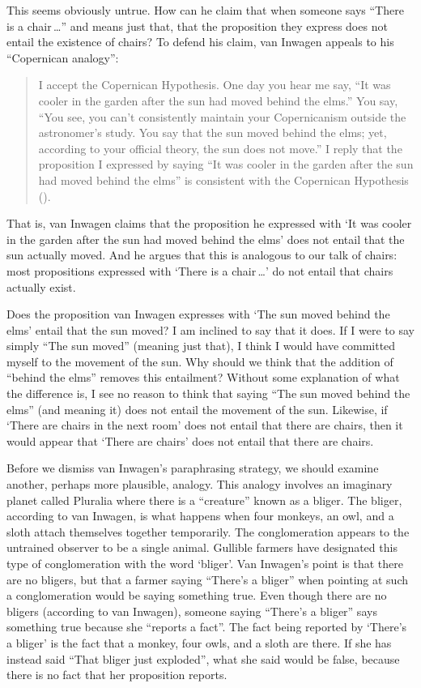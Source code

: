\documentclass[12pt,twoside]{reedfancy}
\begin{document}
\begin{spacing}{1.25}
This seems obviously untrue.  How can he claim that when someone says
``There is a chair\,\ldots '' and means just that, that the
proposition they express does not entail the existence of chairs?  To
defend his claim, van Inwagen appeals to his ``Copernican analogy'':

\begin{quote}
I accept the Copernican Hypothesis.  One day you hear me say, ``It was
cooler in the garden after the sun had moved behind the elms.''  You
say, ``You see, you can't consistently maintain your Copernicanism
outside the astronomer's study.  You say that the sun moved behind the
elms; yet, according to your official theory, the sun does not move.''
I reply that the proposition I expressed by saying ``It was cooler in
the garden after the sun had moved behind the elms'' is consistent
with the Copernican Hypothesis (\citeyear[101]{inwagen1995}).
\end{quote}
That is, van Inwagen claims that the proposition he expressed with `It
was cooler in the garden after the sun had moved behind the elms' does
not entail that the sun actually moved.  And he argues that this is
analogous to our talk of chairs: most propositions expressed with
`There is a chair\,\ldots ' do not entail that chairs actually exist.

Does the proposition van Inwagen expresses with `The sun moved behind
the elms' entail that the sun moved?  I am inclined to say that it
does.  If I were to say simply ``The sun moved'' (meaning just that),
I think I would have committed myself to the movement of the sun.  Why
should we think that the addition of ``behind the elms'' removes this
entailment?  Without some explanation of what the difference is, I see
no reason to think that saying ``The sun moved behind the elms'' (and
meaning it) does not entail the movement of the sun.  Likewise, if
`There are chairs in the next room' does not entail that there are
chairs, then it would appear that `There are chairs' does not entail
that there are chairs.

Before we dismiss van Inwagen's paraphrasing strategy, we should
examine another, perhaps more plausible, analogy.  This analogy
involves an imaginary planet called Pluralia where there is a
``creature'' known as a bliger.  The bliger, according to van Inwagen,
is what happens when four monkeys, an owl, and a sloth attach
themselves together temporarily.  The conglomeration appears to the
untrained observer to be a single animal.  Gullible farmers have
designated this type of conglomeration with the word `bliger'.  Van
Inwagen's point is that there are no bligers, but that a farmer saying
``There's a bliger'' when pointing at such a conglomeration would be
saying something true.  Even though there are no bligers (according to
van Inwagen), someone saying ``There's a bliger'' says something true
because she ``reports a fact''.  The fact being reported by `There's a
bliger' is the fact that a monkey, four owls, and a sloth are there.
If she has instead said ``That bliger just exploded'', what she said
would be false, because there is no fact that her proposition reports.


\end{spacing}
\end{document}

